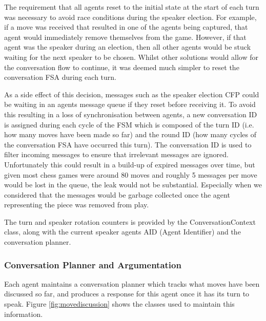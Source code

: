 \documentclass[conference]{IEEEtran}
\begin{document}
The requirement that all agents reset to the initial state at the start of each turn was necessary to avoid race conditions during the speaker election. For example, if a move was received that resulted in one of the agents being captured, that agent would immediately remove themselves from the game. However, if that agent was the speaker during an election, then all other agents would be stuck waiting for the next speaker to be chosen. Whilst other solutions would allow for the conversation flow to continue, it was deemed much simpler to reset the conversation FSA during each turn.

As a side effect of this decision, messages such as the speaker election CFP could be waiting in an agents message queue if they reset before receiving it. To avoid this resulting in a loss of synchronisation between agents, a new conversation ID is assigned during each cycle of the FSM which is composed of the turn ID (i.e. how many moves have been made so far) and the round ID (how many cycles of the conversation FSA have occurred this turn). The conversation ID is used to filter incoming messages to ensure that irrelevant messages are ignored. Unfortunately this could result in a build-up of expired messages over time, but given most chess games were around 80 moves \cite{chessdata} and roughly 5 messages per move would be lost in the queue, the leak would not be substantial. Especially when we considered that the messages would be garbage collected once the agent representing the piece was removed from play.

The turn and speaker rotation counters is provided by the ConversationContext class, along with the current speaker agents AID (Agent Identifier) and the conversation planner. 

\subsubsection{Conversation Planner and Argumentation}

Each agent maintains a conversation planner which tracks what moves have been discussed so far, and produces a response for this agent once it has its turn to speak. Figure \ref{fig:movediscussion} shows the classes used to maintain this information.
\end{document}
